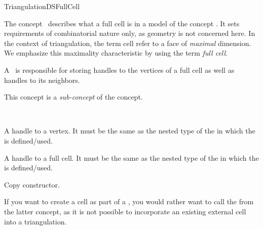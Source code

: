 \begin{ccRefConcept}{TriangulationDSFullCell}

\ccDefinition

The concept \ccRefName\ describes what a full cell is in a model of the concept
. It sets requirements of combinatorial nature
only, as geometry is not concerned here.
In the context of triangulation, the term cell refer to a face of
\emph{maximal} dimension. We emphasize this maximality characteristic by using
the term {\em full cell}.

A \ccRefName\ is responsible for storing handles to the vertices of a
full cell as well as handles to its neighbors.

This concept is a \emph{sub-concept} of the 
concept.

\ccHasModels

\\

\ccTypes

{A handle to a vertex. It must be the same as the
nested type  of the  in which the
 is defined/used.}


{A handle to a full cell. It must be the same as the
nested type  of the  in which the
 is defined/used.}


\ccCreation	
{}


%
{Copy constructor.}

If you want to create a cell as part of a ,
you would rather want to call the  from the latter concept,
as it is not possible to incorporate an existing external cell into
a triangulation.


\end{ccRefConcept}
